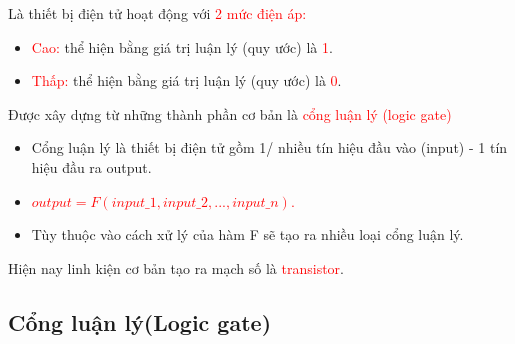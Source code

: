 \documentclass[12pt]{article}
\begin{document}
Là thiết bị điện tử hoạt động với \textcolor{red}{2 mức điện áp:}

\begin{itemize}

    \item \textcolor{red}{Cao:} thể hiện bằng giá trị luận lý (quy ước) là \textcolor{red}{1}.
    \item \textcolor{red}{Thấp:} thể hiện bằng giá trị luận lý (quy ước) là \textcolor{red}{0}. 
\end{itemize}


Được xây dựng từ những thành phần cơ bản là \textcolor{red}{cổng luận lý (logic gate)}
\begin{itemize}
    \item Cổng luận lý là thiết bị điện tử gồm 1/ nhiều tín hiệu đầu vào (input) - 1 tín hiệu đầu ra output.
    \item \textcolor{red}{\begin{math}output = F (input\_1, input\_2, ..., input\_n)\end{math}.}
    \item Tùy thuộc vào cách xử lý của hàm F sẽ tạo ra nhiều loại cổng luận lý.
\end{itemize}

Hiện nay linh kiện cơ bản tạo ra mạch số là \textcolor{red}{transistor}.

\subsection{Cổng luận lý(Logic gate)}
\end{document}

